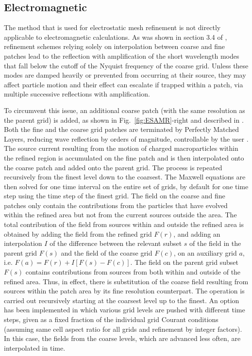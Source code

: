 \subsection{Electromagnetic}
The method that is used for electrostatic mesh refinement is not directly applicable to electromagnetic calculations. As was shown in section 3.4 of \cite{Vayjcp01}, refinement schemes relying solely on interpolation between coarse and fine patches lead to the reflection with amplification of the short wavelength modes that fall below the cutoff of the Nyquist frequency of the coarse grid. Unless these modes are damped heavily or prevented from occurring at their source, they may affect particle motion and their effect can escalate if trapped within a patch, via multiple successive reflections with amplification. 

To circumvent this issue, an additional coarse patch (with the same resolution as the parent grid) is added, as shown in Fig.~\ref{fig:ESAMR}-right and described in \cite{Vaycpc04}. Both the fine and the coarse grid patches are terminated by Perfectly Matched Layers, reducing wave reflection by orders of magnitude, controllable by the user \cite{Berengerjcp96,Vayjcp02}. The source current resulting from the motion of charged macroparticles within the refined region is accumulated on the fine patch and is then interpolated onto the coarse patch and added onto the parent grid. The process is repeated recursively from the finest level down to the coarsest. The Maxwell equations are then solved for one time interval on the entire set of grids, by default for one time step using the time step of the finest grid. The field on the coarse and fine patches only contain the contributions from the particles that have evolved within the refined area but not from the current sources outside the area. The total contribution of the field from sources within and outside the refined area is obtained by adding the field from the refined grid $F(r)$, and adding an interpolation $I$ of the difference between the relevant subset $s$ of the field in the parent grid $F(s)$ and the field of the coarse grid  $F( c )$, on an auxiliary grid $a$, i.e. $F(a)=F(r)+I[F(s)-F( c )]$. The field on the parent grid subset $F(s)$ contains contributions from sources from both within and outside of the refined area. Thus, in effect, there is substitution of the coarse field resulting from sources within the patch area by its fine resolution counterpart. The operation is carried out recursively starting at the coarsest level up to the finest.
An option has been implemented in which various grid levels are pushed with different time steps, given as a fixed fraction of the individual grid Courant conditions (assuming same cell aspect ratio for all grids and refinement by integer factors). In this case, the fields from the coarse levels, which are advanced less often, are interpolated in time. 

